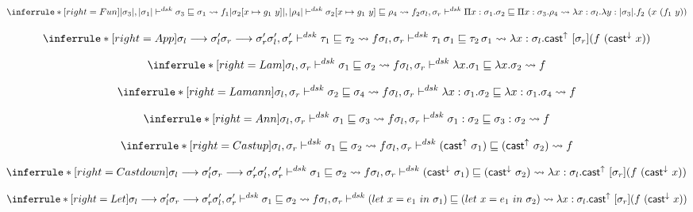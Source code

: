\[
\inferrule*[right=Fun]
{\translated{\sigma_3}, \translated{\sigma_1}\dsk  \sigma_3 \sqsubseteq \sigma_1 \transto{f_1} \\
\translated{\sigma_2[x \mapsto g_1\ y]}, \translated{\rho_4}\dsk  \sigma_2[x \mapsto g_1\ y] \sqsubseteq \rho_4 \transto{f_2} \\
 }
{\sigmal, \sigmar \dsk \Pi x:\sigma_1. \sigma_2 \sqsubseteq \Pi x:\sigma_3. \rho_4 \\
\transto {\lambda x:\sigmal. \lambda y:\translated{\sigma_3} . f_2\ (x\ (f_1\ y))}
}
\]

\[
\inferrule*[right=App]
{\sigmal \longrightarrow \sigmal' \\
\sigmar \longrightarrow \sigmar' \\
\sigmal', \sigmar' \dsk \tau_1 \sqsubseteq \tau_2 \transto {f}\\
}
{\sigmal, \sigmar \dsk \tau_1\, \sigma_1 \sqsubseteq \tau_2\, \sigma_1 \\
\transto {\lambda x:\sigmal. \castupe [\sigmar] (f\ (\castdowne x))}}
\]

\[
\inferrule*[right=Lam]
{
\sigmal, \sigmar \dsk \sigma_1 \sqsubseteq \sigma_2 \transto {f}}
{ \sigmal, \sigmar \dsk \lambda x. \sigma_1 \sqsubseteq \lambda x. \sigma_2 \transto {f}}
\]


\[
\inferrule*[right=Lamann]
{
\sigmal, \sigmar \dsk \sigma_2 \sqsubseteq \sigma_4 \transto{f}}
{\sigmal, \sigmar \dsk \lambda x:\sigma_1. \sigma_2 \sqsubseteq \lambda x:\sigma_1. \sigma_4 \\
\transto {f}}
\]


\[
\inferrule*[right=Ann]
{
\sigmal, \sigmar \dsk  \sigma_1 \sqsubseteq \sigma_3 \transto{f}}
{\sigmal, \sigmar \dsk \sigma_1:\sigma_2 \sqsubseteq \sigma_3:\sigma_2 \transto {f}}
\]

\[
\inferrule*[right=Castup]
{
\sigmal, \sigmar \dsk  \sigma_1 \sqsubseteq \sigma_2 \transto {f}}
{\sigmal, \sigmar \dsk  (\castupe \sigma_1) \sqsubseteq  (\castupe \sigma_2) \transto {f}}
\]


\[
\inferrule*[right=Castdown]
{\sigmal \longrightarrow \sigmal' \\
\sigmar \longrightarrow \sigmar' \\
\sigmal', \sigmar' \dsk  \sigma_1 \sqsubseteq \sigma_2 \transto {f}
}
{\sigmal, \sigmar \dsk  (\castdowne \sigma_1) \sqsubseteq  (\castdowne \sigma_2)
\transto{ \lambda x:\sigmal. \castupe [\sigmar] (f\ (\castdowne x))}}
\]

\[
\inferrule*[right=Let]
{\sigmal \longrightarrow \sigmal'\\
\sigmar \longrightarrow \sigmar' \\
\sigmal', \sigmar' \dsk  \sigma_1 \sqsubseteq \sigma_2 \transto {f}
}
{\sigmal, \sigmar \dsk  (let\ x = e_1\ in\ \sigma_1) \sqsubseteq  (let\ x = e_1\ in\ \sigma_2) \\
\transto{ \lambda x:\sigmal. \castupe [\sigmar] (f\ (\castdowne x))}}
\]

